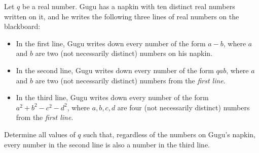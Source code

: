 Let $q$ be a real number. Gugu has a napkin with ten distinct real numbers written on it, and he writes the following three lines of real numbers on the blackboard:

\begin{itemize}
\item In the first line, Gugu writes down every number of the form $a - b$, where $a$ and $b$ are two (not necessarily distinct) numbers on his napkin.
\item In the second line, Gugu writes down every number of the form $qab$, where $a$ and $b$ are two (not necessarily distinct) numbers from the \emph{first line}.
\item In the third line, Gugu writes down every number of the form $a^2 + b^2 - c^2 - d^2$, where $a, b, c, d$ are four (not necessarily distinct) numbers from the \emph{first line}.
\end{itemize}

Determine all values of $q$ such that, regardless of the numbers on Gugu's napkin, every number in the second line is also a number in the third line.
